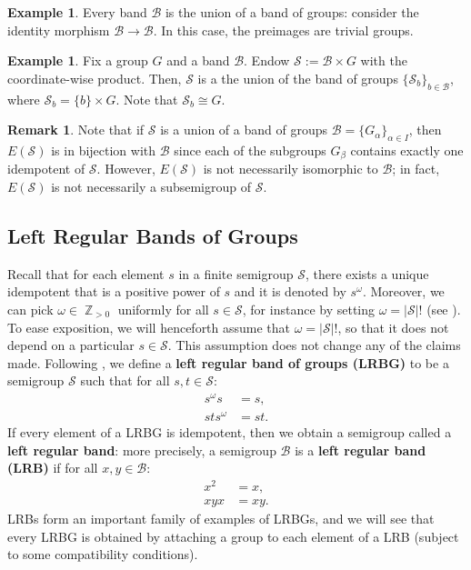 \documentclass[11pt, oneside, reqno]{amsart}
\theoremstyle{definition}
\newtheorem{example}[theorem]{Example}
\newtheorem{remark}[theorem]{Remark}
\numberwithin{equation}{section}
\DeclareMathOperator{\Z}{\mathbb{Z}}
\newcommand{\defn}[1]{{\color{RoyalBlue}\bf#1}}
\def \BB{{\mathcal{B}}}
\def \SS{{\mathcal{S}}}
\begin{document}
\begin{example}
    Every band $\BB$ is the union of a band of groups: consider the identity
    morphism $\BB \xrightarrow{} \BB$. In this case, the preimages are trivial
    groups.
\end{example}

\begin{example}
    Fix a group $G$ and a band $\BB$. Endow $\SS := \BB \times G$ with the
    coordinate-wise product. Then, $\SS$ is a the union of the band of groups
    $\{\SS_b\}_{b \in \BB}$, where $\SS_b = \{b\} \times G$.
    Note that $\SS_b \cong G$.
\end{example}

\begin{remark}
    Note that if $\SS$ is a union of a band of groups
    $\BB = \{G_\alpha\}_{\alpha \in I}$,
    then $E(\SS)$ is in bijection with $\BB$
    since each of the subgroups $G_\beta$ contains exactly one idempotent of
    $\SS$. However, $E(\SS)$ is not necessarily isomorphic to $\BB$;
    in fact, $E(\SS)$ is not necessarily a subsemigroup of $\SS$.
\end{remark}

\subsection{Left Regular Bands of Groups}
\label{appendix:LRBGs}

Recall that for each element $s$ in a finite semigroup $\SS$, there exists a unique idempotent that is a positive power of $s$ and it is denoted by $s^\omega$.
Moreover, we can pick $\omega \in \Z_{> 0}$ uniformly for all $s \in \SS$, for instance by setting $\omega = |\SS|!$ (see \cite[Remark 1.3]{steinberg16monoids}). To ease exposition, we will henceforth assume that $\omega = |\SS|!$, so that it does not depend on a particular $s \in \SS$. This assumption does not change any of the claims made.
Following \cite{ms11HomologySemigroups}, we define a
\defn{left regular band of groups (LRBG)} to be a semigroup $\SS$
such that for all $s,t \in \SS$:
\begin{align}
    \tag{LRBG1}     s^\omega s &= s,     \\
    \tag{LRBG2}     s t s^\omega &= s t.
\end{align}
If every element of a LRBG is idempotent, then we obtain a semigroup called
a \defn{left regular band}: more precisely,
a semigroup $\BB$ is a \defn{left regular band (LRB)} if for all $x, y \in
\BB$:
\begin{align}
    \tag{LRB1}  x^2 &= x, \\
    \tag{LRB2}  x y x &= x y.
\end{align}
LRBs form an important family of examples of LRBGs, and we will see that every
LRBG is obtained by attaching a group to each element of a LRB (subject to some
compatibility conditions).
\end{document}
